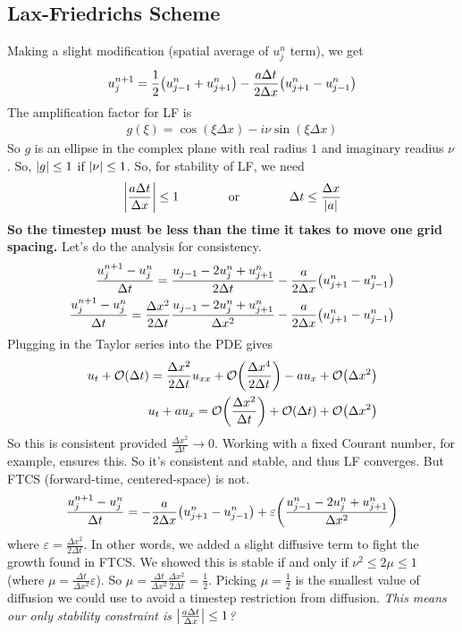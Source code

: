 \documentclass{article}
\newcommand{\E}{\varepsilon}
\newcommand{\Dx}{\Delta x}
\newcommand{\Dt}{\Delta t}
\newcommand{\centdiff}{\frac{u_j^{n+1} - u_j^n}{\Dt}}
\begin{document}
        \subsection{Lax-Friedrichs Scheme}
            Making a slight modification (spatial average of $u_j^n$ term), we get
            \begin{align*}
                u_j^{n+1} = \frac{1}{2}\qty(u_{j-1}^n + u_{j+1}^n) - \frac{a\Dt}{2\Dx}\qty(u_{j+1}^n - u_{j-1}^n)
            \end{align*}
            The amplification factor for LF is
            \begin{align*}
                g(\xi) = \cos(\xi\Dx) - i\nu\sin(\xi\Dx)
            \end{align*}
            So $g$ is an ellipse in the complex plane with real radius $1$ and imaginary readius $\nu$.  So, $\abs{g} \leq 1$ if $\abs{\nu} \leq 1$.  So, for stability of LF, we need
            \begin{align*}
                \abs{\frac{a\Dt}{\Dx}} \leq 1 \qquad\qquad\text{or}\qquad\qquad \Dt \leq \frac{\Dx}{\abs{a}}
            \end{align*}
            \textbf{So the timestep must be less than the time it takes to move one grid spacing.}  Let's do the analysis for consistency.
            \begin{align*}
                \centdiff = \frac{u_{j-1} - 2u_j^n + u_{j+1}^n}{2\Dt} - \frac{a}{2\Dx}\qty(u_{j+1}^n - u_{j-1}^n) \\
                \centdiff = \frac{\Dx^2}{2\Dt}\frac{u_{j-1} - 2u_j^n + u_{j+1}^n}{\Dx^2} - \frac{a}{2\Dx}\qty(u_{j+1}^n - u_{j-1}^n)
            \end{align*}
            Plugging in the Taylor series into the PDE gives
            \begin{align*}
                u_t + \order{\Dt} = \frac{\Dx^2}{2\Dt}u_{xx} + \order{\frac{\Dx^4}{2\Dt}} - au_x + \order{\Dx^2} \\
                u_t + au_x = \order{\frac{\Dx^2}{\Dt}} + \order{\Dt} + \order{\Dx^2}
            \end{align*}
            So this is consistent provided $\frac{\Dx^2}{\Dt} \rightarrow 0$.  Working with a fixed Courant number, for example, ensures this.  So it's consistent and stable, and thus LF converges.  But FTCS (forward-time, centered-space) is not.
            \begin{align*}
                \centdiff = -\frac{a}{2\Dx}\qty(u_{j+1}^n - u_{j-1}^n) + \E\qty(\frac{u_{j-1}^n - 2u_j^n + u_{j+1}^n}{\Dx^2})
            \end{align*}
            where $\E = \frac{\Dx^2}{2\Dt}$.  In other words, we added a slight diffusive term to fight the growth found in FTCS.  We showed this is stable if and only if $\nu^2 \leq 2\mu \leq 1$ (where $\mu = \frac{\Dt}{\Dx^2}\E$).  So $\mu = \frac{\Dt}{\Dx^2}\frac{\Dx^2}{2\Dt} = \frac{1}{2}$.  Picking $\mu = \frac{1}{2}$ is the smallest value of diffusion we could use to avoid a timestep restriction from diffusion.  \emph{This means our only stability constraint is $\abs{\frac{a\Dt}{\Dx}} \leq 1$?}
\end{document}
